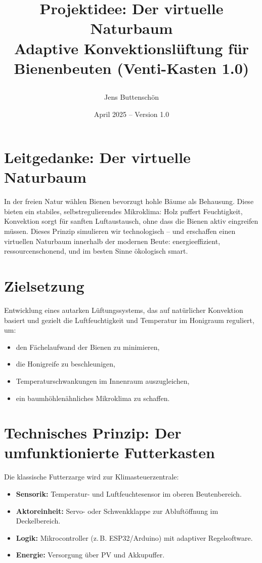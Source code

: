 \documentclass[11pt,a4paper]{article}
\title{\parbox{\linewidth}{\centering\textbf{
Projektidee: Der virtuelle Naturbaum\\
Adaptive Konvektionsl\"uftung f\"ur Bienenbeuten (Venti-Kasten 1.0)}}}
\author{\parbox{\linewidth}{\centering
Jens Buttensch\"on}}
\date{April 2025 -- Version 1.0}
\begin{document}
\maketitle

\section*{Leitgedanke: Der virtuelle Naturbaum}
In der freien Natur w\"ahlen Bienen bevorzugt hohle B\"aume als Behausung. Diese bieten ein
stabiles, selbstregulierendes Mikroklima: Holz puffert Feuchtigkeit, Konvektion sorgt f\"ur sanften
Luftaustausch, ohne dass die Bienen aktiv eingreifen m\"ussen. Dieses Prinzip simulieren wir
technologisch -- und erschaffen einen virtuellen Naturbaum innerhalb der modernen Beute:
energieeffizient, ressourcenschonend, und im besten Sinne \"okologisch smart.

\section{Zielsetzung}
Entwicklung eines autarken L\"uftungssystems, das auf nat\"urlicher Konvektion basiert und gezielt
die Luftfeuchtigkeit und Temperatur im Honigraum reguliert, um:
\begin{itemize}
  \item den F\"achelaufwand der Bienen zu minimieren,
  \item die Honigreife zu beschleunigen,
  \item Temperaturschwankungen im Innenraum auszugleichen,
  \item ein baumh\"ohlen\"ahnliches Mikroklima zu schaffen.
\end{itemize}

\section{Technisches Prinzip: Der umfunktionierte Futterkasten}
Die klassische Futterzarge wird zur Klimasteuerzentrale:
\begin{itemize}
  \item \textbf{Sensorik:} Temperatur- und Luftfeuchtesensor im oberen Beutenbereich.
  \item \textbf{Aktoreinheit:} Servo- oder Schwenkklappe zur Abluft\"offnung im Deckelbereich.
  \item \textbf{Logik:} Mikrocontroller (z.\,B. ESP32/Arduino) mit adaptiver Regelsoftware.
  \item \textbf{Energie:} Versorgung \"uber PV und Akkupuffer.
\end{itemize}
\end{document}
